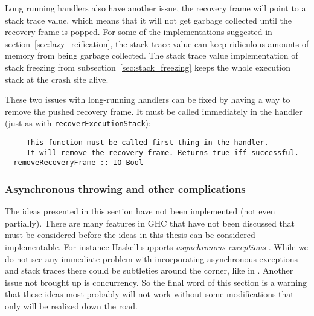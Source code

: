 Long running handlers also have another issue, the
recovery frame will point to a stack trace value, which means that it
will not get garbage collected until the recovery frame is
popped. For some of the implementations suggested in section~\ref{sec:lazy_reification}, the stack trace value can keep ridiculous
amounts of memory from being garbage collected. The stack trace value
implementation of stack freezing from subsection~\ref{sec:stack_freezing} keeps the whole execution stack at the crash
site alive.

These two issues with long-running handlers can be fixed by having a
way to remove the pushed recovery frame. It must be called immediately
in the handler (just as with \texttt{recoverExecutionStack}):

\begin{verbatim}
  -- This function must be called first thing in the handler.
  -- It will remove the recovery frame. Returns true iff successful.
  removeRecoveryFrame :: IO Bool
\end{verbatim}

\subsubsection{Asynchronous throwing and other complications}

The ideas presented in this section have not been implemented (not
even partially). There are many features in GHC that have not been
discussed that must be considered before the ideas in this thesis
can be considered implementable. For instance Haskell supports
\emph{asynchronous exceptions} \cite{marlow2001asynchronous}. While
we do not see any immediate problem with incorporating asynchronous
exceptions and stack traces there could be subtleties around the corner,
like in \cite{edsko_dark_corners_of_throwTo}. Another issue not brought
up is concurrency. So the final word of this section is a warning that
these ideas most probably will not work without some modifications that
only will be realized down the road.
